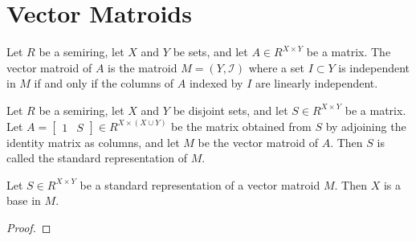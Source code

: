 \section{Vector Matroids}

\begin{definition}
    \label{VectorMatroid}
    \leanok
    Let $R$ be a semiring, let $X$ and $Y$ be sets, and let $A \in R^{X \times Y}$ be a matrix. The vector matroid of $A$ is the matroid $M = (Y, \mathcal{I})$ where a set $I \subset Y$ is independent in $M$ if and only if the columns of $A$ indexed by $I$ are linearly independent.
\end{definition}

\begin{definition}
    \label{StandardRepr}
    \leanok
    Let $R$ be a semiring, let $X$ and $Y$ be disjoint sets, and let $S \in R^{X \times Y}$ be a matrix. Let $A = \begin{bmatrix} 1 & S \end{bmatrix} \in R^{X \times (X \cup Y)}$ be the matrix obtained from $S$ by adjoining the identity matrix as columns, and let $M$ be the vector matroid of $A$. Then $S$ is called the standard representation of $M$.
\end{definition}

\begin{lemma}
    \label{StandardRepr.toMatroid_isBase_X}
    \leanok
    Let $S \in R^{X \times Y}$ be a standard representation of a vector matroid $M$. Then $X$ is a base in $M$.
\end{lemma}

\begin{proof}
    \leanok
    \SeeLean
\end{proof}




